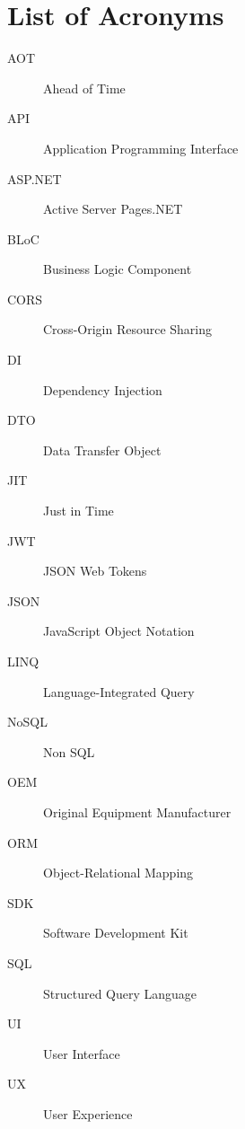 \chapter{List of Acronyms}
\label{chapter:acronyms}

\begin{description}
	\item[AOT] Ahead of Time
	\item[API] Application Programming Interface
	\item[ASP.NET] Active Server Pages.NET
	\item[BLoC] Business Logic Component 
	\item[CORS] Cross-Origin Resource Sharing
	\item[DI] Dependency Injection 
	\item[DTO] Data Transfer Object  
	\item[JIT] Just in Time
	\item[JWT] JSON Web Tokens 
	\item[JSON] JavaScript Object Notation
	\item[LINQ] Language-Integrated Query
	\item[NoSQL] Non SQL 
	\item[OEM] Original Equipment Manufacturer
	\item[ORM] Object-Relational Mapping
	\item[SDK] Software Development Kit
	\item[SQL] Structured Query Language
	\item[UI] User Interface
	\item[UX] User Experience   
\end{description}
